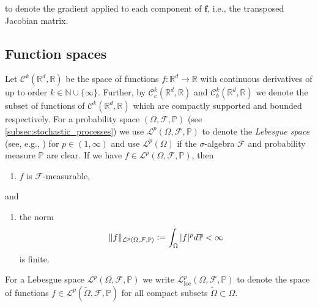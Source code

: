 \documentclass[12pt]{article}
\theoremstyle{definition}
\numberwithin{equation}{section}
\newcommand{\N}{\mathbb{N}}
\newcommand{\R}{\mathbb{R}}
\newcommand{\BP}{\mathbb{P}}
\newcommand{\CF}{\mathcal{F}}
\newcommand{\CL}{\mathcal{L}}
\newcommand{\CC}{\mathcal{C}}
\newcommand{\defeq}{\vcentcolon=}
\begin{document}
 to denote the gradient applied to each component of $\mathbf{f}$, i.e., the transposed Jacobian matrix.
\subsection{Function spaces}
Let $\CC^k(\R^d, \R)$ be the space of functions $f: \R^d \rightarrow \R$ with continuous derivatives of up to order $k \in \N \cup \{\infty\}$. Further, by $\CC_c^k(\R^d, \R)$ and $\CC_b^k(\R^d, \R)$ we denote the subset of functions of $\CC^k(\R^d, \R)$ which are compactly supported and bounded respectively.
For a probability space $(\Omega, \CF, \BP)$ (see \autoref{subsec:stochastic_processes}) we use $\CL^p(\Omega, \CF, \BP)$ to denote the \emph{Lebesgue space} (see, e.g., \cite[pp.~636]{evansPartialDifferentialEquations2010})  for $p \in (1,\infty)$ and use $\CL^p(\Omega)$ if the $\sigma$-algebra $\CF$ and probability measure $\BP$ are clear. If we have $f \in\CL^p(\Omega, \CF, \BP)$, then
\begin{enumerate}[label=(\roman*)]
  \item $f$ is $\CF$-measurable,
\end{enumerate}
and
\begin{enumerate}[resume, label=(\roman*)]
  \item the norm 
  \begin{equation*}
    \lVert f \rVert_{\CL^p(\Omega, \CF, \BP)} \defeq \int_{\Omega} |f|^p d\BP < \infty
  \end{equation*}
  is finite.
\end{enumerate}
For a Lebesgue space $\CL^p(\Omega, \CF, \BP)$ we write $\CL^p_{\text{loc}}(\Omega, \CF, \BP)$ to denote the space of functions $f \in \CL^p(\widetilde{\Omega}, \CF, \BP)$ for all compact subsets $\widetilde{\Omega} \subset \Omega$.
\end{document}
